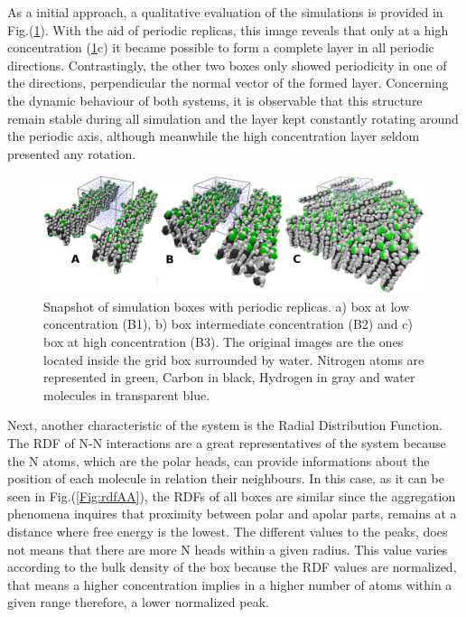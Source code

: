 \documentclass[10pt,a4paper,twoside]{article}
\begin{document}
As a initial approach, a qualitative evaluation of the simulations is provided in Fig.(\ref{Fig:aabox}). With the aid of periodic replicas, this image reveals that only at a high concentration (\ref{Fig:aabox}c) it became possible to form a complete layer in all periodic directions. Contrastingly, the other two boxes only showed periodicity in one of the directions, perpendicular the normal vector of the formed layer. Concerning the dynamic behaviour of both systems, it is observable that this structure remain stable during all simulation and the layer kept constantly rotating around the periodic axis, although meanwhile the high concentration layer seldom presented any rotation.   
\begin{figure}[H]
  \begin{center}
	\includegraphics[width=0.85 \textwidth]{./images/AAPBC}
	\caption{Snapshot of simulation boxes with periodic replicas. a) box at low concentration (B1), b) box intermediate concentration (B2) and c) box at high concentration (B3). The original images are the ones located inside the grid box surrounded by water. Nitrogen atoms are represented in green, Carbon in black, Hydrogen in gray and water molecules in transparent blue. }
	\label{Fig:aabox}
  \end{center}
\end{figure}

Next, another characteristic of the system is the Radial Distribution Function. The RDF of N-N interactions are a great representatives of the system because the N atoms, which are the polar heads, can provide informations about the position of each molecule in relation their neighbours. In this case, as it can be seen in Fig.(\ref{Fig:rdfAA}), the RDFs of all boxes are similar since the aggregation phenomena inquires that proximity between polar and apolar parts, remains at a distance where free energy is the lowest. The different values to the peaks, does not means that there are more N heads within a given radius. This value varies according to the bulk density of the box because the RDF values are normalized, that means a higher concentration implies in a higher number of atoms within a given range  therefore, a lower normalized peak.  
\end{document}
